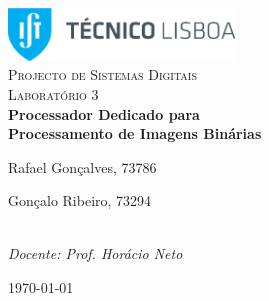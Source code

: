 \begin{titlepage}

	\begin{center}

		\includegraphics[width=6cm]{./title}\\[3cm]

		\textsc{\LARGE Projecto de Sistemas Digitais}\\[1.5cm]

		\textsc{\Large Laboratório 3}\\[1.5cm]


		{ \huge \bfseries Processador Dedicado para \\[3mm] Processamento de Imagens Binárias \\[3cm] }


		\noindent
		\begin{minipage}{0.4\textwidth}
			\begin{flushleft} \large
				Rafael Gonçalves, 73786
			\end{flushleft}
		\end{minipage}
		\begin{minipage}{0.4\textwidth}
			\begin{flushright} \large
				Gonçalo Ribeiro, 73294
			\end{flushright}
		\end{minipage}\\[2.0cm]

		\large \textit{Docente: Prof. Horácio Neto}

		\vfill

		{\large \today}


	\end{center}

\end{titlepage}